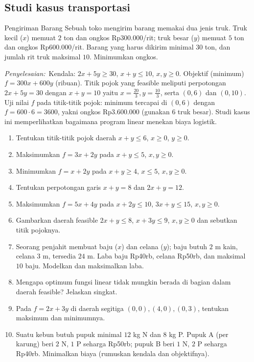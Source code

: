 \documentclass[11pt,a4paper]{report}
\theoremstyle{gaya}
\newcommand{\jawab}{\par\smallskip\noindent\textit{\textcolor{oranye}{Penyelesaian:}}\ }
\begin{document}
\subsection*{Studi kasus transportasi}
\begin{studikasus}{Pengiriman Barang}
Sebuah toko mengirim barang memakai dua jenis truk. Truk kecil ($x$) memuat $2$ ton dan ongkos Rp300.000/rit; truk besar ($y$) memuat $5$ ton dan ongkos Rp600.000/rit. Barang yang harus dikirim minimal $30$ ton, dan jumlah rit truk maksimal $10$. Minimumkan ongkos.

\smallskip
\jawab Kendala: $2x+5y\ge30$, $x+y\le10$, $x,y\ge0$. Objektif (minimum) $f=300x+600y$ (ribuan). Titik pojok yang feasible meliputi perpotongan $2x+5y=30$ dengan $x+y=10$ yaitu $x=\tfrac{20}{3},y=\tfrac{10}{3}$, serta $(0,6)$ dan $(0,10)$. Uji nilai $f$ pada titik-titik pojok: minimum tercapai di $(0,6)$ dengan $f=600\cdot6=3600$, yakni ongkos Rp3.600.000 (gunakan $6$ truk besar). Studi kasus ini memperlihatkan bagaimana program linear menekan biaya logistik.
\end{studikasus}

\begin{latihan}
\begin{enumerate}[leftmargin=*]
  \item Tentukan titik-titik pojok daerah $x+y\le6$, $x\ge0$, $y\ge0$.
  \item Maksimumkan $f=3x+2y$ pada $x+y\le5$, $x,y\ge0$.
  \item Minimumkan $f=x+2y$ pada $x+y\ge4$, $x\le5$, $x,y\ge0$.
  \item Tentukan perpotongan garis $x+y=8$ dan $2x+y=12$.
  \item Maksimumkan $f=5x+4y$ pada $x+2y\le10$, $3x+y\le15$, $x,y\ge0$.
  \item Gambarkan daerah feasible $2x+y\le8$, $x+3y\le9$, $x,y\ge0$ dan sebutkan titik pojoknya.
  \item Seorang penjahit membuat baju ($x$) dan celana ($y$); baju butuh $2$ m kain, celana $3$ m, tersedia $24$ m. Laba baju Rp40rb, celana Rp50rb, dan maksimal $10$ baju. Modelkan dan maksimalkan laba.
  \item Mengapa optimum fungsi linear tidak mungkin berada di bagian dalam daerah feasible? Jelaskan singkat.
  \item Pada $f=2x+3y$ di daerah segitiga $(0,0),(4,0),(0,3)$, tentukan maksimum dan minimumnya.
  \item Suatu kebun butuh pupuk minimal $12$ kg N dan $8$ kg P. Pupuk A (per karung) beri $2$ N, $1$ P seharga Rp50rb; pupuk B beri $1$ N, $2$ P seharga Rp40rb. Minimalkan biaya (rumuskan kendala dan objektifnya).
\end{enumerate}
\end{latihan}
\end{document}
